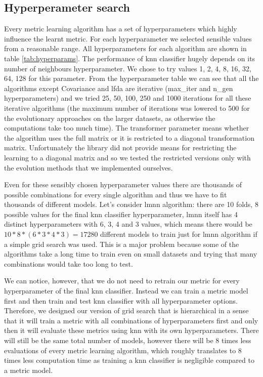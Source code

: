 \documentclass[12pt,a4paper]{report}
\begin{document}
\subsection{Hyperperameter search} \label{chap:exp:hypsearch}

Every metric learning algorithm has a set of hyperparameters which highly influence the learnt metric. For each hyperparameter we selected sensible values from a reasonable range. All hyperparameters for each algorithm are shown in table \ref{tab:hyperparams}. The performance of \ac{knn} classifier hugely depends on its number of neighbours hyperparameter. We chose to try values 1, 2, 4, 8, 16, 32, 64, 128 for this parameter. From the hyperparameter table we can see that all the algorithms except Covariance and \ac{lfda} are iterative (max\_iter and n\_gen hyperparameters) and we tried 25, 50, 100, 250 and 1000 iterations for all these iterative algorithms (the maximum number of iterations was lowered to 500 for the evolutionary approaches on the larger datasets, as otherwise the computations take too much time). The transformer parameter means whether the algorithm uses the full matrix or it is restricted to a diagonal transformation matrix. Unfortunately the library did not provide means for restricting the learning to a diagonal matrix and so we tested the restricted versions only with the evolution methods that we implemented ourselves. %



Even for these sensibly chosen hyperparameter values there are thousands of possible combinations for every single algorithm and thus we have to fit thousands of different models. Let's consider \ac{lmnn} algorithm: there are 10 folds, 8 possible values for the final \ac{knn} classifier hyperparameter, \ac{lmnn} itself has 4 distinct hyperparameters with 6, 3, 4 and 3 values, which means there would be $10*8*(6*3*4*3)=17280$ different models to train just for \ac{lmnn} algorithm if a simple grid search was used. This is a major problem because some of the algorithms take a long time to train even on small datasets and trying that many combinations would take too long to test.

We can notice, however, that we do not need to retrain our metric for every hyperparameter of the final \ac{knn} classifier. Instead we can train a metric model first and then train and test \ac{knn} classifier with all hyperparameter options. Therefore, we designed our version of grid search that is hierarchical in a sense that it will train a metric with all combinations of hyperparameters first and only then it will evaluate these metrics using \ac{knn} with its own hyperparameters. There will still be the same total number of models, however there will be 8 times less evaluations of every metric learning algorithm, which roughly translates to 8 times less computation time as training a \ac{knn} classifier is negligible compared to a metric model.
\end{document}
